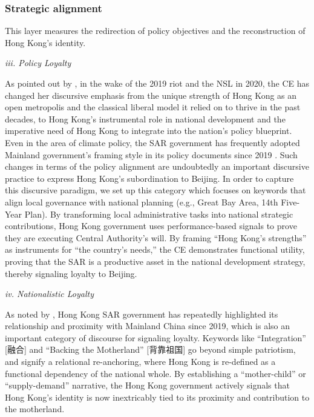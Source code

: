 \documentclass[9pt,a4paper,twocolumn,twoside]{rho-class/rho}
\begin{document}
        \subsubsection{Strategic alignment}

            This layer measures the redirection of policy objectives and the reconstruction of Hong Kong's identity.

            \textit{iii. Policy Loyalty}

            As pointed out by \textcite{peck2024hongkong}, in the wake of the 2019 riot and the NSL in 2020, the CE has changed her discursive emphasis from the unique strength of 
            Hong Kong as an open metropolis and the classical liberal model it relied on to thrive in the past decades, to Hong Kong's instrumental role in national development and 
            the imperative need of Hong Kong to integrate into the nation's policy blueprint. Even in the area of climate policy, the SAR government has frequently adopted Mainland 
            government's framing style in its policy documents since 2019 \parencite{kwan2023introduction}. Such changes in terms of the policy alignment are undoubtedly an important 
            discursive practice to express Hong Kong's subordination to Beijing. In order to capture this discursive paradigm, we set up this category which focuses on keywords 
            that align local governance with national planning (e.g., Great Bay Area, 14th Five-Year Plan). By transforming local administrative tasks into national strategic 
            contributions, Hong Kong government uses performance-based signals to prove they are executing Central Authority's will. By framing ``Hong Kong's strengths'' as instruments 
            for ``the country's needs,'' the CE demonstrates functional utility, proving that the SAR is a productive asset in the national development strategy, thereby signaling loyalty to Beijing.

            \textit{iv. Nationalistic Loyalty}

            As noted by \textcite{kwan2023introduction}, Hong Kong SAR government has repeatedly highlighted its relationship and proximity with Mainland China since 2019, which is 
            also an important category of discourse for signaling loyalty. Keywords like ``Integration'' [融合] and ``Backing the Motherland'' [背靠祖国] go beyond simple patriotism, 
            and signify a relational re-anchoring, where Hong Kong is re-defined as a functional dependency of the national whole. By establishing a ``mother-child'' or ``supply-demand'' 
            narrative, the Hong Kong government actively signals that Hong Kong's identity is now inextricably tied to its proximity and contribution to the motherland.
\end{document}
